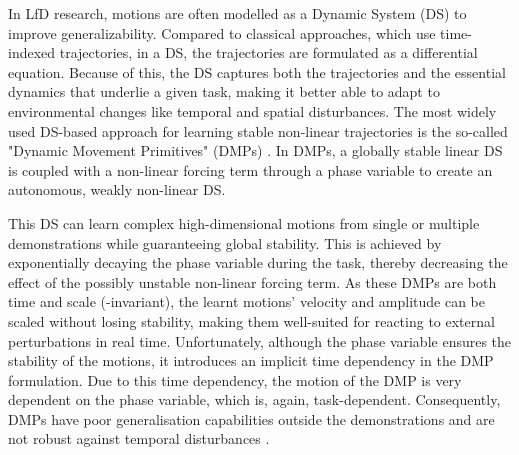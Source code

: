 In LfD research, motions are often modelled as a Dynamic System (DS) \cite{khansari-zadehLearningStableNonlinear2011} to improve generalizability. Compared to classical approaches, which use time-indexed trajectories, in a DS, the trajectories are formulated as a differential equation. Because of this, the DS captures both the trajectories and the essential dynamics that underlie a given task, making it better able to adapt to environmental changes like temporal and spatial disturbances. The most widely used DS-based approach for learning stable non-linear trajectories is the so-called "Dynamic Movement Primitives" (DMPs) \cite{ijspeertDynamicalMovementPrimitives2013,saverianoDynamicMovementPrimitives2021,wangLearningDemonstrationUsing2021,sidiropoulosReversibleDynamicMovement2021,ginesiOvercomingDrawbacksDynamic2021,rozanecNeuralDynamicMovement2022,liProDMPsUnifiedPerspective2022}. In DMPs, a globally stable linear DS is coupled with a non-linear forcing term through a phase variable to create an autonomous, weakly non-linear DS. 

This DS can learn complex high-dimensional motions from single \cite{ijspeertDynamicalMovementPrimitives2013,prakashDynamicTrajectoryGeneration2020} or multiple demonstrations \cite{matsubaraLearningParametricDynamic2011,pervezLearningTaskparameterizedDynamic2018} while guaranteeing global stability. This is achieved by exponentially decaying the phase variable during the task, thereby decreasing the effect of the possibly unstable non-linear forcing term. As these DMPs are both time and scale (-invariant), the learnt motions' velocity and amplitude can be scaled without losing stability, making them well-suited for reacting to external perturbations in real time. Unfortunately, although the phase variable ensures the stability of the motions, it introduces an implicit time dependency in the DMP formulation. Due to this time dependency, the motion of the DMP is very dependent on the phase variable, which is, again, task-dependent. Consequently, DMPs have poor generalisation capabilities outside the demonstrations and are not robust against temporal disturbances \cite{neumannLearningRobotMotions2015}.


